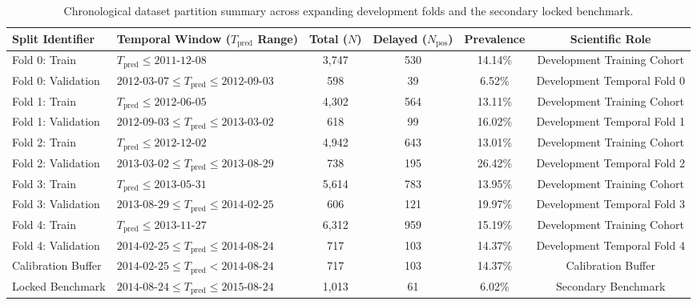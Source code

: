 \documentclass[11pt,a4paper]{article}
\begin{document}
\begin{table}[htbp]
\centering
\caption{Chronological dataset partition summary across expanding development folds and the secondary locked benchmark.}
\label{tab:dataset_protocol}
\small
\begin{tabular}{llcccc}
\toprule
\textbf{Split Identifier} & \textbf{Temporal Window ($T_{\text{pred}}$ Range)} & \textbf{Total ($N$)} & \textbf{Delayed ($N_{\text{pos}}$)} & \textbf{Prevalence} & \textbf{Scientific Role} \\
\midrule
Fold 0: Train & $T_{\text{pred}} \le \text{2011-12-08}$ & 3,747 & 530 & 14.14\% & Development Training Cohort \\
Fold 0: Validation & $\text{2012-03-07} \le T_{\text{pred}} \le \text{2012-09-03}$ & 598 & 39 & 6.52\% & Development Temporal Fold 0 \\
Fold 1: Train & $T_{\text{pred}} \le \text{2012-06-05}$ & 4,302 & 564 & 13.11\% & Development Training Cohort \\
Fold 1: Validation & $\text{2012-09-03} \le T_{\text{pred}} \le \text{2013-03-02}$ & 618 & 99 & 16.02\% & Development Temporal Fold 1 \\
Fold 2: Train & $T_{\text{pred}} \le \text{2012-12-02}$ & 4,942 & 643 & 13.01\% & Development Training Cohort \\
Fold 2: Validation & $\text{2013-03-02} \le T_{\text{pred}} \le \text{2013-08-29}$ & 738 & 195 & 26.42\% & Development Temporal Fold 2 \\
Fold 3: Train & $T_{\text{pred}} \le \text{2013-05-31}$ & 5,614 & 783 & 13.95\% & Development Training Cohort \\
Fold 3: Validation & $\text{2013-08-29} \le T_{\text{pred}} \le \text{2014-02-25}$ & 606 & 121 & 19.97\% & Development Temporal Fold 3 \\
Fold 4: Train & $T_{\text{pred}} \le \text{2013-11-27}$ & 6,312 & 959 & 15.19\% & Development Training Cohort \\
Fold 4: Validation & $\text{2014-02-25} \le T_{\text{pred}} \le \text{2014-08-24}$ & 717 & 103 & 14.37\% & Development Temporal Fold 4 \\
Calibration Buffer & $\text{2014-02-25} \le T_{\text{pred}} < \text{2014-08-24}$ & 717 & 103 & 14.37\% & Calibration Buffer \\
Locked Benchmark & $\text{2014-08-24} \le T_{\text{pred}} \le \text{2015-08-24}$ & 1,013 & 61 & 6.02\% & Secondary Benchmark \\
\bottomrule
\end{tabular}
\end{table}
\end{document}
